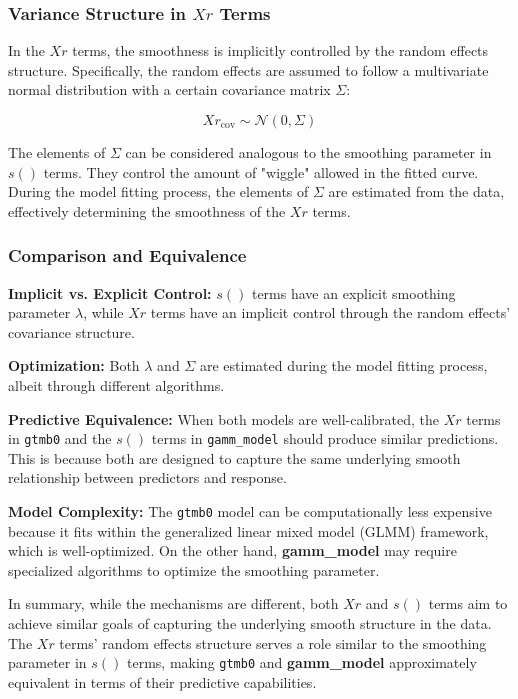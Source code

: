 \documentclass[12pt, twoside,hidelinks]{article}
\theoremstyle{definition}
\numberwithin{equation}{section}
\begin{document}
\subsubsection{Variance Structure in \(Xr\) Terms}

In the \(Xr\) terms, the smoothness is implicitly controlled by the random effects structure. Specifically, the random effects are assumed to follow a multivariate normal distribution with a certain covariance matrix \(\Sigma\):

\[
Xr_{\text{cov}} \sim \mathcal{N}(0, \Sigma)
\]

The elements of \(\Sigma\) can be considered analogous to the smoothing parameter in \(s()\) terms. They control the amount of "wiggle" allowed in the fitted curve. During the model fitting process, the elements of \(\Sigma\) are estimated from the data, effectively determining the smoothness of the \(Xr\) terms.

\subsubsection{Comparison and Equivalence}

\textbf{Implicit vs. Explicit Control:} \(s()\) terms have an explicit smoothing parameter \(\lambda\), while \(Xr\) terms have an implicit control through the random effects' covariance structure.
\newline

\textbf{Optimization:} Both \(\lambda\) and \(\Sigma\) are estimated during the model fitting process, albeit through different algorithms.
\newline

\textbf{Predictive Equivalence:} When both models are well-calibrated, the \(Xr\) terms in \texttt{gtmb0} and the \(s()\) terms in \texttt{gamm\_model} should produce similar predictions. This is because both are designed to capture the same underlying smooth relationship between predictors and response.
\newline

\textbf{Model Complexity:} The \texttt{gtmb0} model can be computationally less expensive because it fits within the generalized linear mixed model (GLMM) framework, which is well-optimized. On the other hand, \textbf{gamm\_model} may require specialized algorithms to optimize the smoothing parameter.

In summary, while the mechanisms are different, both \(Xr\) and \(s()\) terms aim to achieve similar goals of capturing the underlying smooth structure in the data. The \(Xr\) terms' random effects structure serves a role similar to the smoothing parameter in \(s()\) terms, making \texttt{gtmb0} and \textbf{gamm\_model} approximately equivalent in terms of their predictive capabilities.
\end{document}
